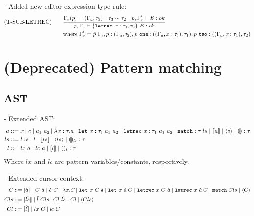 \documentclass[10pt,a4paper,english]{article}
\newcommand\letin[3]{\texttt{let}~#1~#2~#3}
\newcommand\letrec[3]{\texttt{letrec}~#1~#2~#3}
\newcommand\match[1]{\texttt{match}~#1}
\begin{document}
- Added new editor expression type rule:
\begin{align}
  (\text{T-SUB-LETREC})\qquad
&\frac{\Gamma_{e}(p) = (\Gamma_{a},\tau_3) \quad \tau_3\sim\tau_2 \quad p,\Gamma_{e}' \vdash E : ok}{p,\Gamma_{e} \vdash \{\texttt{letrec}~x : \tau_1,\tau_2\}.E : ok}\\
&\text{where}~\Gamma_{e}' = \bar{p}~\Gamma_{e}, p : (\Gamma_{a}, \tau_2), p~\texttt{one} : ((\Gamma_{a},x : \tau_1), \tau_1), p~\texttt{two} : ((\Gamma_{a},x : \tau_1),\tau_2)
\end{align}

\newpage


\section{(Deprecated) Pattern matching}
\subsection{AST}
- Extended AST:
\begin{align}
  a &::= x
  \mid c
  \mid \app{a_1}{a_2}
  \mid \abs{\bind{x}{\tau}}{a}
  \mid \letin{\bind{x}{\tau_1}}{a_1}{a_2}
  \mid \letrec{\bind{x}{\tau_1}}{a_1}{a_2}
  \mid \bind{\texttt{match}}{\tau}~ls
  \mid \cursor{a}
  \mid \breakpoint{a}
  \mid \bind{\hole}{\tau}\\
  ls &::= l~ls
  \mid l 
  \mid \cursor{ls}
  \mid \breakpoint{ls}
  \mid \bind{\hole_{ls}}{\tau}\\
  l &::= lx~a
  \mid lc~a
  \mid \cursor{l}
  \mid \bind{\hole_l}{\tau}
\end{align}
Where $lx$ and $lc$ are pattern variables/constants, respectively.

- Extended cursor context:
\begin{align}
  C &::= \cursor{\hat{a}}
\mid \app{C}{\hat{a}}
\mid \app{\hat{a}}{C}
\mid \abs{x}{C}
\mid \letin{x}{C}{\hat{a}}
\mid \letin{x}{\hat{a}}{C}
\mid \letrec{x}{C}{\hat{a}}
\mid \letrec{x}{\hat{a}}{C}
\mid \match{Cls}
\mid \breakpoint{C}\\
  Cls &::= \cursor{\hat{ls}}
  \mid \hat{l}~Cls
  \mid Cl~\hat{ls}
  \mid Cl
  \mid \breakpoint{Cls}\\
  Cl &::= \cursor{\hat{l}}
  \mid lx~C
  \mid lc~C
\end{align}
\end{document}

